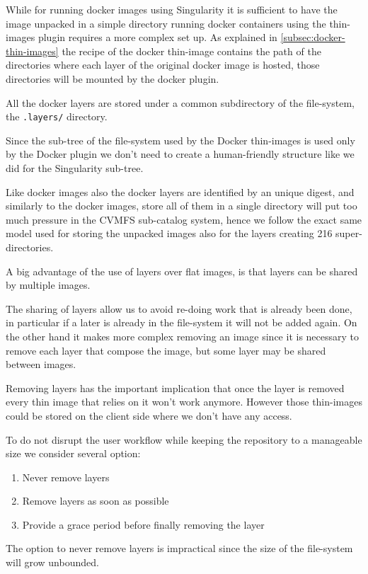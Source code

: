 While for running docker images using Singularity it is sufficient to have the
image unpacked in a simple directory running docker containers using the
thin-images plugin requires a more complex set up.  As explained in
\ref{subsec:docker-thin-images} the recipe of the docker thin-image contains
the path of the directories where each layer of the original docker image is
hosted, those directories will be mounted by the docker plugin.

All the docker layers are stored under a common subdirectory of the
file-system, the \texttt{.layers/} directory.

Since the sub-tree of the file-system used by the Docker thin-images is used only
by the Docker plugin we don't need to create a human-friendly structure like we
did for the Singularity sub-tree.

Like docker images also the docker layers are identified by an unique digest,
and similarly to the docker images, store all of them in a single directory
will put too much pressure in the CVMFS sub-catalog system, hence we follow the
exact same model used for storing the unpacked images also for the layers
creating 216 super-directories.

A big advantage of the use of layers over flat images, is that layers can be
shared by multiple images.

The sharing of layers allow us to avoid re-doing work that is already been
done, in particular if a later is already in the file-system it will not be
added again. On the other hand it makes more complex removing an image since it
is necessary to remove each layer that compose the image, but some layer may be
shared between images.

Removing layers has the important implication that once the layer is removed
every thin image that relies on it won’t work anymore.  However those
thin-images could be stored on the client side where we don’t have any access.

To do not disrupt the user workflow while keeping the repository to a manageable
size we consider several option: 
\begin{enumerate}
\item Never remove layers
\item Remove layers as soon as possible
\item Provide a grace period before finally removing the layer
\end{enumerate}

The option to never remove layers is impractical since the size of the
file-system will grow unbounded.

